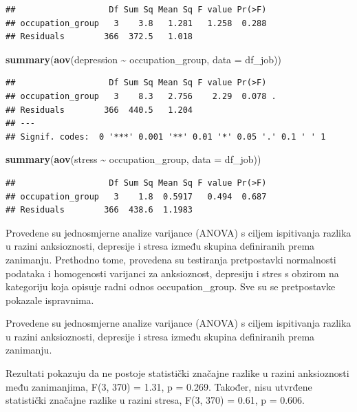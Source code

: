 \documentclass[
]{article}
\newenvironment{Shaded}{\begin{snugshade}}{\end{snugshade}}
\newcommand{\AttributeTok}[1]{\textcolor[rgb]{0.13,0.29,0.53}{#1}}
\newcommand{\FunctionTok}[1]{\textcolor[rgb]{0.13,0.29,0.53}{\textbf{#1}}}
\newcommand{\NormalTok}[1]{#1}
\newcommand{\SpecialCharTok}[1]{\textcolor[rgb]{0.81,0.36,0.00}{\textbf{#1}}}
\begin{document}
\begin{verbatim}
##                   Df Sum Sq Mean Sq F value Pr(>F)
## occupation_group   3    3.8   1.281   1.258  0.288
## Residuals        366  372.5   1.018
\end{verbatim}

\begin{Shaded}
\begin{Highlighting}[]
\FunctionTok{summary}\NormalTok{(}\FunctionTok{aov}\NormalTok{(depression }\SpecialCharTok{\textasciitilde{}}\NormalTok{ occupation\_group, }\AttributeTok{data =}\NormalTok{ df\_job))}
\end{Highlighting}
\end{Shaded}

\begin{verbatim}
##                   Df Sum Sq Mean Sq F value Pr(>F)  
## occupation_group   3    8.3   2.756    2.29  0.078 .
## Residuals        366  440.5   1.204                 
## ---
## Signif. codes:  0 '***' 0.001 '**' 0.01 '*' 0.05 '.' 0.1 ' ' 1
\end{verbatim}

\begin{Shaded}
\begin{Highlighting}[]
\FunctionTok{summary}\NormalTok{(}\FunctionTok{aov}\NormalTok{(stress }\SpecialCharTok{\textasciitilde{}}\NormalTok{ occupation\_group, }\AttributeTok{data =}\NormalTok{ df\_job))}
\end{Highlighting}
\end{Shaded}

\begin{verbatim}
##                   Df Sum Sq Mean Sq F value Pr(>F)
## occupation_group   3    1.8  0.5917   0.494  0.687
## Residuals        366  438.6  1.1983
\end{verbatim}

Provedene su jednosmjerne analize varijance (ANOVA) s ciljem ispitivanja
razlika u razini anksioznosti, depresije i stresa između skupina
definiranih prema zanimanju. Prethodno tome, provedena su testiranja
pretpostavki normalnosti podataka i homogenosti varijanci za
anksioznost, depresiju i stres s obzirom na kategoriju koja opisuje
radni odnos occupation\_group. Sve su se pretpostavke pokazale
ispravnima.

Provedene su jednosmjerne analize varijance (ANOVA) s ciljem ispitivanja
razlika u razini anksioznosti, depresije i stresa između skupina
definiranih prema zanimanju.

Rezultati pokazuju da ne postoje statistički značajne razlike u razini
anksioznosti među zanimanjima, F(3, 370) = 1.31, p = 0.269. Također,
nisu utvrđene statistički značajne razlike u razini stresa, F(3, 370) =
0.61, p = 0.606.
\end{document}
